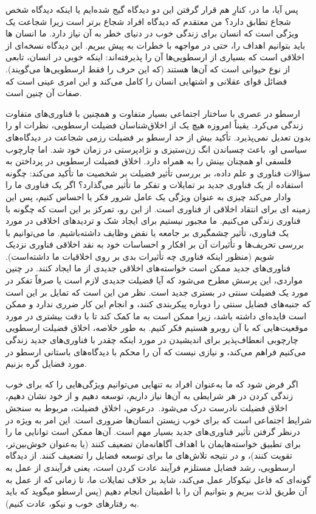 پس آیا، ما در، کنارِ هم قرار گرفتن این دو دیدگاه گیج شده‌ایم یا اینکه دیدگاه شخص شجاع تطابق دارد؟ من معتقدم که دیدگاه افراد شجاع برتر است زیرا شجاعت یک ویژگی است که انسان برای زندگی خوب در دنیای خطر به آن نیاز دارد.
ما انسان ها باید بتوانیم اهداف را، حتی در مواجهه با خطرات به پیش ببریم.
این دیدگاه نسخه‌ای از اخلاقی است که بسیاری از ارسطویی‌ها آن را پذیرفته‌اند: اینکه خوبی در انسان، تابعی از نوع حیوانی است که آن‌ها هستند (که این حرف را فقط ارسطویی‌ها می‌گویند).
فضائل قوای عقلانی و اشتهایی انسان را کامل می‌کند و این امری عینی است که صفات آن چنین است.

ارسطو در عصری با ساختار اجتماعی بسیار متفاوت و همچنین با فناوری‌های متفاوت زندگی می‌کرد.
یقیناً امروزه هیچ یک از اخلاق‌شناسان فضیلت ارسطویی، نظرات او را بدون تعدیل نمی‌پذیرد.
تأکید بیش از حد ارسطو بر فضیلت رزمی شجاعت در دیدگاه‌های سیاسی او، باعث چسباندن انگ زن‌ستیزی و نژادپرستی در زمان خود شد.
اما چارچوب فلسفی او همچنان بینش را به همراه دارد.
اخلاق فضیلت ارسطویی در پرداختن به سؤالات فناوری و علم داده، بر بررسی تأثیر فضیلت بر شخصیت ما تأکید می‌کند: چگونه استفاده از یک فناوری جدید بر تمایلات و تفکر ما تأثیر می‌گذارد؟ اگر یک فناوری ما را وادار می‌کند چیزی به عنوان ویژگی یک عامل شرور فکر یا احساس کنیم، پس این زمینه ای برای انتقاد اخلاقی از فناوری است.
از این رو، تمرکز بر این است که چگونه با فناوری زندگی می‌کنیم.
ما مجبور نیستیم برای ایجاد شک و تردیدهای اخلاقی در مورد یک فناوری، تأثیر چشمگیری بر جامعه یا نقض وظایف داشته‌باشیم.
ما می‌توانیم با بررسی تحریف‌ها و تأثیرات آن بر افکار و احساسات خود به نقد اخلاقی فناوری نزدیک شویم (منظور اینکه فناوری چه تأثیرات بدی بر روی اخلاقیات ما داشته‌است).
فناوری‌های جدید ممکن است خواسته‌های اخلاقی جدیدی از ما ایجاد کنند.
در چنین مواردی، این پرسش مطرح می‌شود که آیا فضیلت جدیدی لازم است یا صرفاً تفکر در مورد یک فضیلت سنتی در بستری جدید است.
نظر من این است که تمایل بر این است که جنبه‌های فضایل سنتی را دوباره پیکربندی کنند، و انجام این کار ضرری ندارد و ممکن است فایده‌ای داشته باشد، زیرا ممکن است به ما کمک کند تا با دقت بیشتری در مورد موقعیت‌هایی که با آن روبرو هستیم فکر کنیم.
به طور خلاصه، اخلاق فضیلت ارسطویی چارچوبی انعطاف‌پذیر برای اندیشیدن در مورد اینکه چقدر با فناوری‌های جدید زندگی می‌کنیم فراهم می‌کند، و نیازی نیست که آن را محکم با دیدگاه‌های باستانی ارسطو در مورد فضایل گره بزنیم.

اگر فرض شود که ما به‌عنوان افراد به تنهایی می‌توانیم ویژگی‌هایی را که برای خوب زندگی کردن در هر شرایطی به آن‌ها نیاز داریم، توسعه دهیم و از خود نشان دهیم، اخلاق فضیلت نادرست درک می‌شود.\ درعوض، اخلاق فضیلت، مربوط به سنجش شرایط اجتماعی است که برای خوب زیستن انسان‌ها ضروری است.
این امر به ویژه در درنظر گرفتن تأثیر فناوری‌های جدید بسیار مهم است.
آن‌ها ممکن است توانایی ما را برای تطبیق خواسته‌هایمان با اهداف آگاهانه‌مان تضعیف کنند (یا به‌عنوان خوش‌بین‌تر، تقویت کنند)، و در نتیجه تلاش‌های ما برای توسعه فضایل را تضعیف کنند.
از دیدگاه ارسطویی، رشد فضایل مستلزم فرآیند عادت کردن است، یعنی فرآیندی از عمل به گونه‌ای که فاعل نیکوکار عمل می‌کند، شاید بر خلاف تمایلات ما، تا زمانی که از عمل به آن طریق لذت ببریم و بتوانیم آن را با اطمینان انجام دهیم (پس ارسطو میگوید که باید به رفتارهای خوب و نیکو، عادت کنیم).


